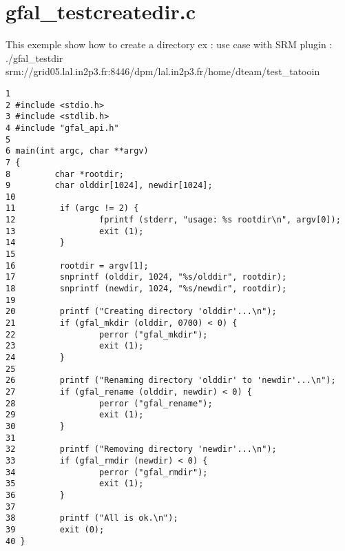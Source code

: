 \section{gfal\_\-testcreatedir.c}
This exemple show how to create a directory ex : use case with SRM plugin : ./gfal\_\-testdir srm://grid05.lal.in2p3.fr:8446/dpm/lal.in2p3.fr/home/dteam/test\_\-tatooin



\begin{DocInclude}\begin{verbatim}1 
2 #include <stdio.h>
3 #include <stdlib.h>
4 #include "gfal_api.h"
5 
6 main(int argc, char **argv)
7 {
8         char *rootdir;
9         char olddir[1024], newdir[1024];
10 
11         if (argc != 2) {
12                 fprintf (stderr, "usage: %s rootdir\n", argv[0]);
13                 exit (1);
14         }
15 
16         rootdir = argv[1];
17         snprintf (olddir, 1024, "%s/olddir", rootdir);
18         snprintf (newdir, 1024, "%s/newdir", rootdir);
19 
20         printf ("Creating directory 'olddir'...\n");
21         if (gfal_mkdir (olddir, 0700) < 0) {
22                 perror ("gfal_mkdir");
23                 exit (1);
24         }
25 
26         printf ("Renaming directory 'olddir' to 'newdir'...\n");
27         if (gfal_rename (olddir, newdir) < 0) {
28                 perror ("gfal_rename");
29                 exit (1);
30         }
31 
32         printf ("Removing directory 'newdir'...\n");
33         if (gfal_rmdir (newdir) < 0) {
34                 perror ("gfal_rmdir");
35                 exit (1);
36         }
37 
38         printf ("All is ok.\n");
39         exit (0);
40 }
\end{verbatim}
\end{DocInclude}
 